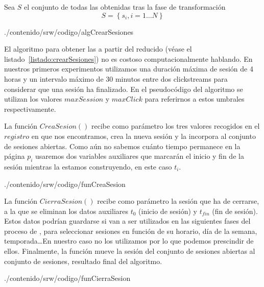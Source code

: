 \begin{defn}\label{def:1-2-4-cjto-sesion}
  Sea $S$ el conjunto de todas las \sns obtenidas tras la fase de transformación
  \begin{equation}\label{eq:1-2-4-cjto-sesiones}
    S = \left\{s_i, i = 1\ldots N\right\}
  \end{equation}
\end{defn}


                       {./contenido/srw/codigo/algCrearSesiones}

El algoritmo para obtener las \sns a partir del \flog reducido (véase el listado~\ref{listado:crearSesiones}) no es costoso computacionalmente hablando. En nuestros primeros experimentos utilizamos una duración máxima de sesión de 4 horas y un intervalo máximo de 30 minutos entre dos clickstreams para considerar que una sesión ha finalizado. En el pseudocódigo del algoritmo se utilizan los valores $maxSession$ y $maxClick$ para referirnos a estos umbrales respectivamente.

La función $CreaSesion()$ recibe como parámetro los tres valores recogidos en el $registro$ en que nos encontramos, crea la nueva sesión y la incorpora al conjunto de sesiones abiertas. Como aún no sabemos cuánto tiempo permanece en la página $p_i$ usaremos dos variables auxiliares que marcarán el inicio y fin de la sesión mientras la estamos construyendo, en este caso $t_i$.


                       {./contenido/srw/codigo/funCreaSesion}

La función $CierraSesion()$ recibe como parámetro la sesión que ha de cerrarse, a la que se eliminan los datos auxiliares $t_0$ (inicio de sesión) y $t_{fin}$ (fin de sesión). Estos datos podrían guardarse si van a ser utilizados en las siguientes fases del proceso de \WUM, para seleccionar sesiones en función de su horario, día de la semana, temporada\ldots En nuestro caso no los utilizamos por lo que podemos prescindir de ellos. Finalmente, la función mueve la sesión del conjunto de sesiones abiertas al conjunto de sesiones, resultado final del algoritmo.


                       {./contenido/srw/codigo/funCierraSesion}

